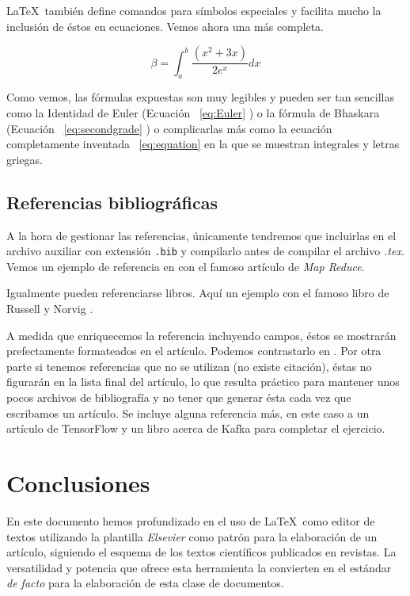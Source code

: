 \documentclass[review]{elsarticle}
\begin{document}
\LaTeX\ también define comandos para símbolos especiales y facilita mucho la inclusión de éstos en ecuaciones. Vemos ahora una más completa.


\begin{equation} \label{eq:equation} 
  \beta = \int_{a}^{b}{\frac{(x^2 + 3x)}{2e^x}dx}
\end{equation}

Como vemos, las fórmulas expuestas son muy legibles y pueden ser tan sencillas como la Identidad de Euler (Ecuación ~\ref{eq:Euler} ) o la fórmula de Bhaskara (Ecuación ~\ref{eq:secondgrade} ) o complicarlas más como la ecuación completamente inventada ~\ref{eq:equation} en la que se muestran integrales y letras griegas. 


\subsection{Referencias bibliográficas}

A la hora de gestionar las referencias, únicamente tendremos que incluirlas en el archivo auxiliar con extensión \texttt{.bib} y compilarlo antes de compilar el archivo \textit{.tex}. Vemos un ejemplo de referencia en \cite{Dean:2004:MSD:1251254.1251264} con el famoso artículo de \textit{Map Reduce}.

Igualmente pueden referenciarse libros. Aquí un ejemplo con el famoso libro de Russell y Norvig \cite{Russell:2003:AIM:773294}.

A medida que enriquecemos la referencia incluyendo campos, éstos se mostrarán prefectamente formateados en el artículo. Podemos contrastarlo en \cite{Groman:1996:ESH:381984.381988}. Por otra parte si tenemos referencias que no se utilizan (no existe citación), éstas no figurarán en la lista final del artículo, lo que resulta práctico para mantener unos pocos archivos de bibliografía y no tener que generar ésta cada vez que escribamos un artículo. 
Se incluye alguna referencia más, en este caso a un artículo de TensorFlow \cite{tensorflow2015-whitepaper} y un libro acerca de Kafka \cite{Narkhede:2017:KDG:3175825} para completar el ejercicio.

\section{Conclusiones}

En este documento hemos profundizado en el uso de \LaTeX\ como editor de textos utilizando la plantilla \textit{Elsevier} como patrón para la elaboración de un artículo, siguiendo el esquema de los textos científicos publicados en revistas. La versatilidad y potencia que ofrece esta herramienta la convierten en el estándar \textit{de facto} para la elaboración de esta clase de documentos. 

\section*{}


\end{document}
